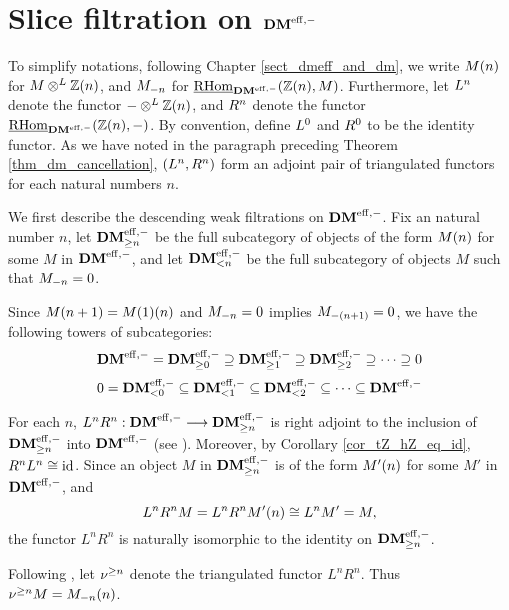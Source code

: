 \section{Slice filtration on $\DMeff$}
To simplify notations, following Chapter \ref{sect_dmeff_and_dm},
we write $\tZ[n]{M}$ for $M \tDM \Z(n)$, and $\hZ[n]{M}$ for 
$\ihomDMf(\Z(n), M)$. Furthermore, let $\LDMf{n}$ denote the
functor $- \tDM \Z(n)$, and $\RDMf{n}$ denote the functor 
$\ihomDMf(\Z(n), -)$. By convention, define $\LDMf{0}$ and 
$\RDMf{0}$ to be the identity functor. As we have noted in
the paragraph preceding Theorem \ref{thm_dm_cancellation}, 
$(\LDMf{n}, \RDMf{n})$ form an adjoint pair of triangulated 
functors for each natural numbers $n$.

We first describe the descending weak filtrations on $\DMeff$. Fix
an natural number $n$, let $\GFiltDM[n]{\DMeff}$ be the full 
subcategory of objects of the form $\tZ[n]{M}$ for some $M$ in 
$\DMeff$, and let $\LFiltDM[n]{\DMeff}$ be the full subcategory of 
objects $M$ such that $\hZ[n]{M} = 0$.

Since $\tZ[n + 1]{M} = \tZ[n]{\tZ[1]{M}}$ and $\hZ[n]{M} = 0$ 
implies $\hZ[(n + 1)]{M} = 0$, we have the following towers of 
subcategories:
\begin{equation}\label{eq_gslice_tower_DMeff}
\DMeff = \GFiltDM[0]{\DMeff} \supseteq \GFiltDM[1]{\DMeff} 
   \supseteq \GFiltDM[2]{\DMeff} \supseteq \cdots \supseteq 0
\end{equation}
\begin{equation}\label{eq_lslice_tower_DMeff}
0 = \LFiltDM[0]{\DMeff} \subseteq \LFiltDM[1]{\DMeff} \subseteq 
   \LFiltDM[2]{\DMeff} \subseteq \cdots \subseteq \DMeff
\end{equation}

For each $n$, $L^n R^n : \DMeff \to \GFiltDM[n]{\DMeff}$ is right
adjoint to the inclusion of $\GFiltDM[n]{\DMeff}$ into $\DMeff$
(see \cite[1.1]{HuKa}). Moreover, by Corollary 
\ref{cor_tZ_hZ_eq_id}, $R^nL^n \cong \id$. Since an object $M$ in 
$\GFiltDM[n]{\DMeff}$ is of the form $\tZ[n]{M'}$ for some $M'$ in 
$\DMeff$, and
\[
L^nR^n M = L^nR^n \tZ[n]{M'} \cong L^n M' = M,
\]
the functor $L^nR^n$ is naturally isomorphic to the identity on
$\GFiltDM[n]{\DMeff}$. 

\begin{defn}
Following \cite{HuKa}, let $\sgDM{n}$ denote the triangulated functor
$L^nR^n$. Thus $\sgDM{n}M=\LHI[n]{\RHI[n]{M}}$.
\end{defn}

